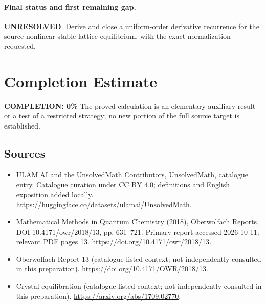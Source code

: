 \documentclass[11pt]{article}
\begin{document}
\paragraph{Final status and first remaining gap.}
\textbf{UNRESOLVED}. Derive and close a uniform-order derivative recurrence for the source nonlinear stable lattice equilibrium, with the exact normalization requested.

\section{Completion Estimate}
\noindent\textbf{COMPLETION: 0\%}
The proved calculation is an elementary auxiliary result or a test of a restricted strategy; no new portion of the full source target is established.

\subsection{Sources}
\begin{itemize}
\item[\hypertarget{source:statement:1}{S1}] ULAM.AI and the UnsolvedMath Contributors, UnsolvedMath, catalogue entry. Catalogue curation under CC BY 4.0; definitions and English exposition added locally.
\url{https://huggingface.co/datasets/ulamai/UnsolvedMath}.
\item[\hypertarget{source:statement:2}{S2}] Mathematical Methods in Quantum Chemistry (2018), Oberwolfach Reports, DOI 10.4171/owr/2018/13, pp. 631--721. Primary report accessed 2026-10-11; relevant PDF pages 13.
\url{https://doi.org/10.4171/owr/2018/13}.
\item[\hypertarget{source:statement:3}{S3}] Oberwolfach Report 13 (catalogue-listed context; not independently consulted in this preparation).
\url{https://doi.org/10.4171/OWR/2018/13}.
\item[\hypertarget{source:statement:4}{S4}] Crystal equilibration (catalogue-listed context; not independently consulted in this preparation).
\url{https://arxiv.org/abs/1709.02770}.
\end{itemize}
\label{end:statement}
\end{document}
